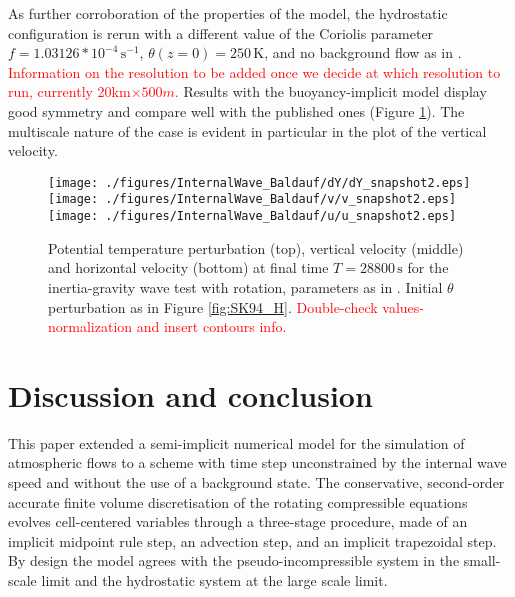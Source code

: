 \documentclass{ametsoc}
\theoremstyle{definition}
\newcommand{\benacchio}[1]{\textcolor{red}{#1}}
\begin{document}
As further corroboration of the properties of the model, the hydrostatic configuration is rerun with a different value of the Coriolis parameter $f=1.03126*10^{-4}\,\textrm{s}^{-1}$, $\theta(z=0)=250\,\textrm{K}$, and no background flow as in \cite{BaldaufBrdar2013}. \benacchio{Information on the resolution to be added once we decide at which resolution to run, currently 20km$\times500m$.} Results with the buoyancy-implicit model display good symmetry and compare well with the published ones (Figure \ref{fig:BB13}). The multiscale nature of the case is evident in particular in the plot of the vertical velocity.

\begin{figure}
\centering
 \texttt{[image: ./figures/InternalWave\_Baldauf/dY/dY\_snapshot2.eps]}
 \texttt{[image: ./figures/InternalWave\_Baldauf/v/v\_snapshot2.eps]}
 \texttt{[image: ./figures/InternalWave\_Baldauf/u/u\_snapshot2.eps]}
 \caption{Potential temperature perturbation (top), vertical velocity (middle) and horizontal velocity (bottom) at final time $T=28800\,\textrm{s}$ for the inertia-gravity wave test with rotation, parameters as in \cite{BaldaufBrdar2013}. Initial $\theta$ perturbation as in Figure \ref{fig:SK94_H}. \benacchio{Double-check values-normalization and insert contours info.}}
  \label{fig:BB13}
\end{figure}


\section{Discussion and conclusion}
\label{sec:Conclusions}	

This paper extended a semi-implicit numerical model for the simulation of atmospheric flows to a scheme with time step unconstrained by the internal wave speed and without the use of a background state. The conservative, second-order accurate finite volume discretisation of the rotating compressible equations evolves cell-centered variables through a three-stage procedure, made of an implicit midpoint rule step, an advection step, and an implicit trapezoidal step. By design the model agrees with the pseudo-incompressible system in the small-scale limit and the hydrostatic system at the large scale limit.
\end{document}

